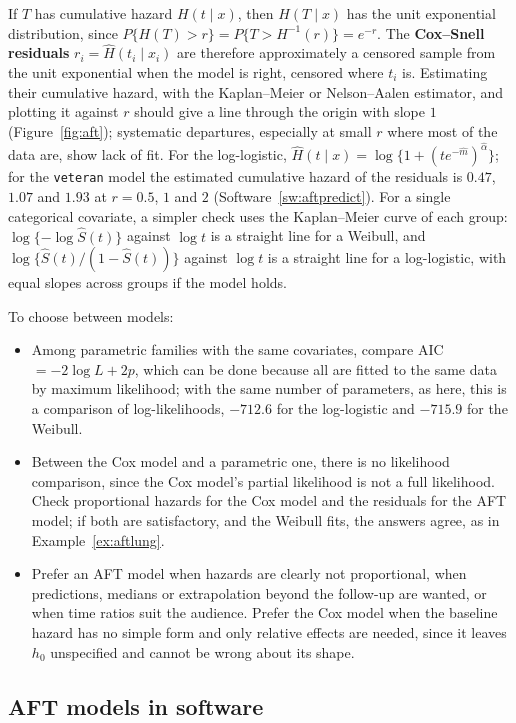 \documentclass[11pt,a4paper]{article}
\numberwithin{equation}{section}
\theoremstyle{definition}
\begin{document}
If $T$ has cumulative hazard $H(t \mid x)$, then $H(T \mid x)$ has the unit exponential distribution, since $P\{H(T) > r\} = P\{T > H^{-1}(r)\} = e^{-r}$. The \textbf{Cox--Snell residuals} $r_i = \hat H(t_i \mid x_i)$ are therefore approximately a censored sample from the unit exponential when the model is right, censored where $t_i$ is. Estimating their cumulative hazard, with the Kaplan--Meier
or Nelson--Aalen estimator, and plotting it against $r$ should give a line through the origin with slope $1$ (Figure~\ref{fig:aft}); systematic departures, especially at small $r$ where most of the data are, show lack of fit. For the log-logistic, $\hat H(t \mid x) = \log\{1 + (te^{-\hat m})^{\hat\alpha}\}$; for the \texttt{veteran} model the estimated cumulative hazard of the residuals is $0.47$, $1.07$ and $1.93$
at $r = 0.5$, $1$ and $2$ (Software~\ref{sw:aftpredict}). For a single categorical covariate, a simpler check uses the Kaplan--Meier curve of each group: $\log\{-\log\hat S(t)\}$ against $\log t$ is a straight line for a Weibull, and $\log\{\hat S(t)/(1 - \hat S(t))\}$ against $\log t$ is a straight line for a log-logistic, with equal slopes across groups if the model holds.

To choose between models:
\begin{itemize}
\item Among parametric families with the same covariates, compare AIC $= -2\log L + 2p$, which can be done because all are fitted to the same data by maximum likelihood; with the same number of parameters, as here, this is a comparison of log-likelihoods, $-712.6$ for the log-logistic and $-715.9$ for the Weibull.
\item Between the Cox model and a parametric one, there is no likelihood comparison, since the Cox model's partial likelihood is not a full likelihood. Check proportional hazards for the Cox model and the residuals for the AFT model; if both are satisfactory, and the Weibull fits, the answers agree, as in Example~\ref{ex:aftlung}.
\item Prefer an AFT model when hazards are clearly not proportional, when predictions, medians or extrapolation beyond the follow-up are wanted, or when time ratios suit the audience. Prefer the Cox model when the baseline hazard has no simple form and only relative effects are needed, since it leaves $h_0$ unspecified and cannot be wrong about its shape.
\end{itemize}

\subsection{AFT models in software}
\label{ssec:software10}
\end{document}
